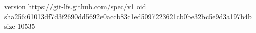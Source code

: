 version https://git-lfs.github.com/spec/v1
oid sha256:61013df7d3f2690dd5692e0accb83c1ed5097223621cb0be32bc5e9d3a197b4b
size 10535
